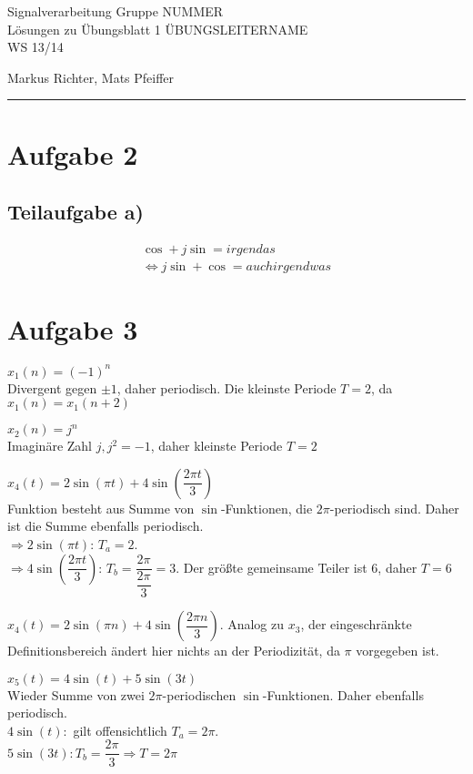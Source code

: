 \documentclass[a4paper, fontsize=10pt]{scrartcl}
\begin{document}
 

{\large Signalverarbeitung \hfill Gruppe NUMMER}\\  
{\large Lösungen zu Übungsblatt 1} \hfill ÜBUNGSLEITERNAME\\
{\large WS 13/14}
\begin{flushright}Markus Richter, Mats Pfeiffer\end{flushright}
\rule{\textwidth}{.3mm}

\section*{Aufgabe 2}
\subsection*{Teilaufgabe a)}
\begin{align*}
\cos+j\sin=irgendas
\\\Leftrightarrow j\sin+\cos=auch irgendwas
\end{align*}
\section*{Aufgabe 3}
$ x_1(n)=(-1)^n $\\
Divergent gegen $\pm1$, daher periodisch. Die kleinste Periode $T=2$, da $x_1(n)=x_1(n+2)$\bigskip

$ x_2(n)=j^n$\\
Imaginäre Zahl $j, j^2=-1$, daher kleinste Periode $T=2$\bigskip

$x_4(t)=2\sin(\pi t)+4\sin\left( \dfrac{2\pi t}{3}\right)$\\
Funktion besteht aus Summe von $\sin$-Funktionen, die $2\pi $-periodisch sind. Daher ist die Summe ebenfalls periodisch.\\
$\Rightarrow 2\sin (\pi t)$: $T_a=2$.\\$\Rightarrow 4\sin\left( \dfrac{2\pi t}{3}\right)$: $T_b=\dfrac{2\pi}{\dfrac {2\pi}{3}}=3$. Der größte gemeinsame Teiler ist $6$, daher $T=6$\bigskip

$x_4(t)=2\sin(\pi n)+4\sin\left( \dfrac{2\pi n}{3}\right)$. Analog zu $x_3$, der eingeschränkte Definitionsbereich ändert hier nichts an der Periodizität, da $\pi$  vorgegeben ist.\bigskip

$x_5(t)=4\sin (t)+5\sin (3t)$\\
Wieder Summe von zwei $2\pi$-periodischen $\sin$-Funktionen. Daher ebenfalls periodisch.\\
$4\sin (t):$ gilt offensichtlich $T_a=2\pi$.\\$5\sin (3t): T_b=\dfrac{2\pi}{3} \Rightarrow T=2\pi$\bigskip
\end{document}
